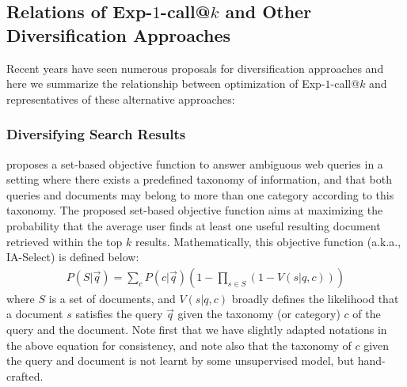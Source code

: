 \subsection{Relations of Exp-$1$-call@$k$ and Other Diversification Approaches}

Recent years have seen numerous proposals for diversification
approaches and here we summarize the relationship between optimization
of Exp-$1$-call@$k$ and representatives of these alternative
approaches:

\subsubsection{Diversifying Search Results}
\cite{agrawal09diversifying} proposes a set-based objective function
to answer ambiguous web queries in a setting where there exists a predefined taxonomy of information, and that both queries and documents
may belong to more than one category according to this taxonomy. The proposed set-based objective function aims at maximizing the probability that the average user finds at least one useful resulting document retrieved within the top $k$ results. Mathematically, this objective function (a.k.a., IA-Select) is defined below:
\begin{align}
	P(S|\vec{q}) = \sum_{c} P(c|\vec{q}) \left( 1 - \prod_{s\in S}(1-V(s| q, c))\right) 
\label{eq:diversifykObjectiveFunction}
\end{align}
where $S$ is a set of documents, and $V(s|q, c)$ broadly defines the likelihood that a document $s$ satisfies the query $\vec{q}$ given the taxonomy (or category) $c$ of the query and the document. Note first that we have slightly adapted notations in the above equation for consistency, and note also that the taxonomy of $c$ given the query and document is not learnt by some unsupervised model, but hand-crafted. 

